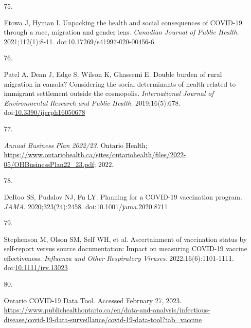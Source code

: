 \documentclass[
]{article}
\newlength{\cslhangindent}
\newlength{\csllabelwidth}
\newlength{\cslentryspacingunit} %
\newenvironment{CSLReferences}[2] %
 {%
  \setlength{\parindent}{0pt}
  \ifodd #1
  \let\oldpar\par
  \def\par{\hangindent=\cslhangindent\oldpar}
  \fi
  \setlength{\parskip}{#2\cslentryspacingunit}
 }%
 {}
\newcommand{\CSLLeftMargin}[1]{\parbox[t]{\csllabelwidth}{#1}}
\newcommand{\CSLRightInline}[1]{\parbox[t]{\linewidth - \csllabelwidth}{#1}\break}
\begin{document}
\begin{CSLReferences}{0}{0}
\leavevmode{}%
\CSLLeftMargin{75. }%
\CSLRightInline{Etowa J, Hyman I. Unpacking the health and social
consequences of {COVID}-19 through a race, migration and gender lens.
\emph{Canadian Journal of Public Health}. 2021;112(1):8-11.
doi:\href{https://doi.org/10.17269/s41997-020-00456-6}{10.17269/s41997-020-00456-6}}

\leavevmode{}%
\CSLLeftMargin{76. }%
\CSLRightInline{Patel A, Dean J, Edge S, Wilson K, Ghassemi E. Double
burden of rural migration in canada? Considering the social determinants
of health related to immigrant settlement outside the cosmopolis.
\emph{International Journal of Environmental Research and Public
Health}. 2019;16(5):678.
doi:\href{https://doi.org/10.3390/ijerph16050678}{10.3390/ijerph16050678}}

\leavevmode{}%
\CSLLeftMargin{77. }%
\CSLRightInline{\emph{{A}nnual {B}usiness {P}lan 2022/23}. Ontario
Health;
\url{https://www.ontariohealth.ca/sites/ontariohealth/files/2022-05/OHBusinessPlan22_23.pdf};
2022.}

\leavevmode{}%
\CSLLeftMargin{78. }%
\CSLRightInline{DeRoo SS, Pudalov NJ, Fu LY. Planning for a {COVID}-19
vaccination program. \emph{{JAMA}}. 2020;323(24):2458.
doi:\href{https://doi.org/10.1001/jama.2020.8711}{10.1001/jama.2020.8711}}

\leavevmode{}%
\CSLLeftMargin{79. }%
\CSLRightInline{Stephenson M, Olson SM, Self WH, et al. Ascertainment of
vaccination status by self-report versus source documentation: Impact on
measuring {COVID}-19 vaccine effectiveness. \emph{Influenza and Other
Respiratory Viruses}. 2022;16(6):1101-1111.
doi:\href{https://doi.org/10.1111/irv.13023}{10.1111/irv.13023}}

\leavevmode{}%
\CSLLeftMargin{80. }%
\CSLRightInline{{Ontario COVID-19 Data Tool}. Accessed February 27,
2023.
\url{https://www.publichealthontario.ca/en/data-and-analysis/infectious-disease/covid-19-data-surveillance/covid-19-data-tool?tab=vaccine}}

\end{CSLReferences}
\end{document}
